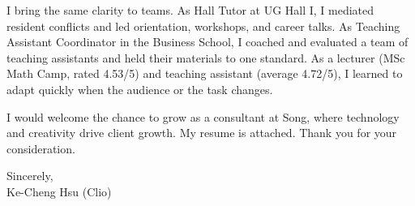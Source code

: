 \documentclass[11pt,letterpaper]{article}
\begin{document}
I bring the same clarity to teams. As Hall Tutor at UG Hall I, I mediated resident conflicts and led orientation, workshops, and career talks. As Teaching Assistant Coordinator in the Business School, I coached and evaluated a team of teaching assistants and held their materials to one standard. As a lecturer (MSc Math Camp, rated 4.53/5) and teaching assistant (average 4.72/5), I learned to adapt quickly when the audience or the task changes.

I would welcome the chance to grow as a consultant at Song, where technology and creativity drive client growth. My resume is attached. Thank you for your consideration.

\vspace{0.7em}
Sincerely,\\[1.0em]
Ke-Cheng Hsu (Clio)
\end{document}
